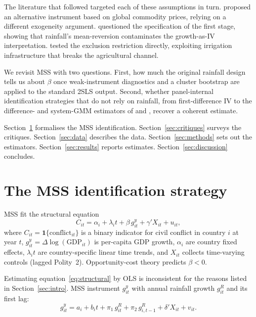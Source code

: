 \documentclass[11pt,a4paper]{article}
\begin{document}
The literature that followed targeted each of these assumptions in
turn. \citet{BrucknerCiccone2010} proposed an alternative instrument
based on global commodity prices, relying on a different exogeneity
argument. \citet{Ciccone2011} questioned the specification of the
first stage, showing that rainfall's mean-reversion contaminates the
growth-as-IV interpretation. \citet{Sarsons2015} tested the exclusion
restriction directly, exploiting irrigation infrastructure that breaks
the agricultural channel.

We revisit MSS with two questions. First, how much the original
rainfall design tells us about $\beta$ once weak-instrument diagnostics
and a cluster bootstrap are applied to the standard 2SLS output.
Second, whether panel-internal identification strategies that do not
rely on rainfall, from \citet{AndersonHsiao1981} first-difference IV
to the difference- and system-GMM estimators of
\citet{ArellanoBond1991} and \citet{BlundellBond1998}, recover a
coherent estimate.

Section~\ref{sec:identification} formalises the MSS identification.
Section~\ref{sec:critiques} surveys the critiques.
Section~\ref{sec:data} describes the data. Section~\ref{sec:methods}
sets out the estimators. Section~\ref{sec:results} reports estimates.
Section~\ref{sec:discussion} concludes.

\section{The MSS identification strategy}\label{sec:identification}
MSS fit the structural equation
\begin{equation}
C_{it} = \alpha_i + \lambda_i t + \beta\, g^{y}_{it} + \gamma' X_{it} + u_{it},
\label{eq:structural}
\end{equation}
where $C_{it} = \mathbf{1}\{\text{conflict}_{it}\}$ is a binary indicator for civil
conflict in country $i$ at year $t$, $g^{y}_{it} = \Delta \log(\text{GDP}_{it})$ is
per-capita GDP growth, $\alpha_i$ are country fixed effects, $\lambda_i t$ are
country-specific linear time trends, and $X_{it}$ collects time-varying controls
(lagged Polity~2). Opportunity-cost theory \citep{Grossman1991} predicts
$\beta < 0$.

Estimating equation~\eqref{eq:structural} by OLS is inconsistent for the reasons
listed in Section~\ref{sec:intro}. MSS instrument $g^{y}_{it}$ with annual
rainfall growth $g^{R}_{it}$ and its first lag:
\begin{equation}
g^{y}_{it} = a_i + b_i t + \pi_1\, g^{R}_{it} + \pi_2\, g^{R}_{i,t-1}
             + \delta' X_{it} + v_{it}.
\label{eq:firststage}
\end{equation}
\end{document}
